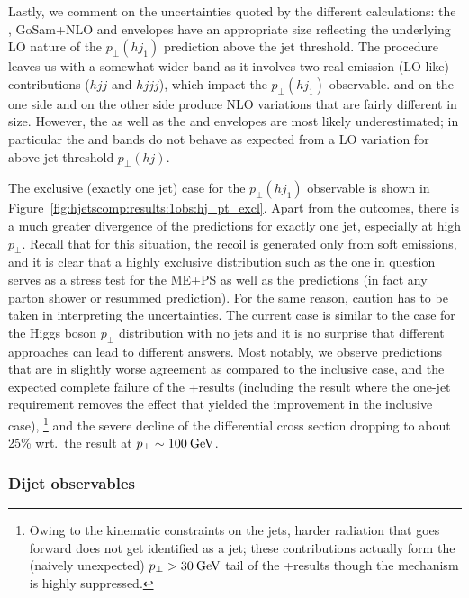 Lastly, we comment on the uncertainties quoted by the different
calculations: the \Resbos, GoSam{}+\Sherpa NLO and \Minlo envelopes
have an appropriate size reflecting the underlying LO nature of the
$p_\perp(hj_1)$ prediction above the jet threshold. The \Loopsim
procedure leaves us with a somewhat wider band as it involves two
real-emission (LO-like) contributions ($hjj$ and $hjjj$), which impact
the $p_\perp(hj_1)$ observable.
\MGaMC and \Sherpa \MEPSatNLO on the one side and \Herwig on the other
side produce NLO variations that are fairly different in size.
However, the \Herwig as well as the \Powheg and \Sherpa \NNLOPS envelopes 
are most likely underestimated; in particular the \Powheg and \Sherpa \NNLOPS 
bands do not behave as
expected from a LO variation for above-jet-threshold $p_\perp(hj)$. 

The exclusive (exactly one jet) case for the $p_\perp(hj_1)$
observable is shown in Figure~\ref{fig:hjetscomp:results:1obs:hj_pt_excl}.
Apart from the \NNLOPS outcomes, there is a much greater divergence of
the predictions for exactly one jet, especially at high $p_\perp$.
Recall that for this situation, the recoil is generated only from soft emissions, and
it is clear that a highly exclusive distribution such as the one in
question serves as a stress test for the ME+PS as well as the \NNLOPS
predictions (in fact any parton shower or resummed prediction). For
the same reason, caution has to be taken in interpreting the 
uncertainties. The current case is similar to the case for the Higgs
boson $p_\perp$ distribution with no jets and it is no surprise that
different approaches can lead to different answers. Most notably, we
observe \NNLOPS predictions that are in slightly worse agreement as
compared to the inclusive case, and the expected complete failure of the
\GoSam{}+\Sherpa results (including the \Loopsim result where the
one-jet requirement removes the effect that yielded the
improvement in the inclusive case),%
\footnote{Owing to the kinematic constraints on the jets, harder
  radiation that goes forward does not get identified as a jet;
  these contributions actually form the (naively unexpected)
  $p_\perp>30\text{\:GeV}$ tail of the \GoSam{}+\Sherpa results though the
  mechanism is highly suppressed.}
and the severe decline of the \Herwig differential cross section
dropping to about 25\% wrt.~the \Powheg result at $p_\perp\sim100\text{\:GeV}$.



\subsubsection{Dijet observables}
\label{sec:hjetscomp:results:2jobs}

